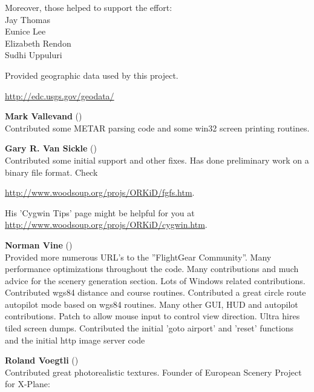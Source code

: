   Moreover, those helped to support the effort:\\
      Jay Thomas \\
      Eunice Lee \\
      Elizabeth Rendon \\
      Sudhi Uppuluri 
  \medskip


\noindent
 \textbf{}
  \medskip

  Provided geographic data used by this project.
 \medskip

\href{http://edc.usgs.gov/geodata/}{http://edc.usgs.gov/geodata/}
 \medskip

\noindent \textbf{Mark Vallevand}
()\\
  Contributed some METAR parsing code and some win32 screen printing routines.
\medskip

\noindent \textbf{Gary R. Van Sickle}
()\\
  Contributed some initial  support and other fixes. Has done
  preliminary work on a binary file format. Check
  \medskip

 \href{http://www.woodsoup.org/projs/ORKiD/fgfs.htm}{http://www.woodsoup.org/projs/ORKiD/fgfs.htm}.
 \medskip


  His 'Cygwin Tips' page might be helpful for you at
  \medskip
  \href{http://www.woodsoup.org/projs/ORKiD/cygwin.htm}{http://www.woodsoup.org/projs/ORKiD/cygwin.htm}.
  \medskip

\noindent \textbf{Norman Vine} ()\\
  Provided more numerous URL's to the ''FlightGear Community''.
  Many performance optimizations throughout the code.  Many contributions
  and much advice for the scenery generation section.  Lots of Windows
  related contributions. Contributed wgs84 distance and course routines.
  Contributed a great circle route autopilot mode based on wgs84 routines.
  Many other GUI, HUD and autopilot contributions.  Patch to allow mouse input to control view direction. Ultra hires tiled screen dumps. Contributed the initial 'goto airport' and 'reset' functions and the initial http image server code
\medskip

\noindent \textbf{Roland Voegtli}
()\\
 Contributed great photorealistic textures.   Founder of European Scenery Project for
 X-Plane:
 \medskip

